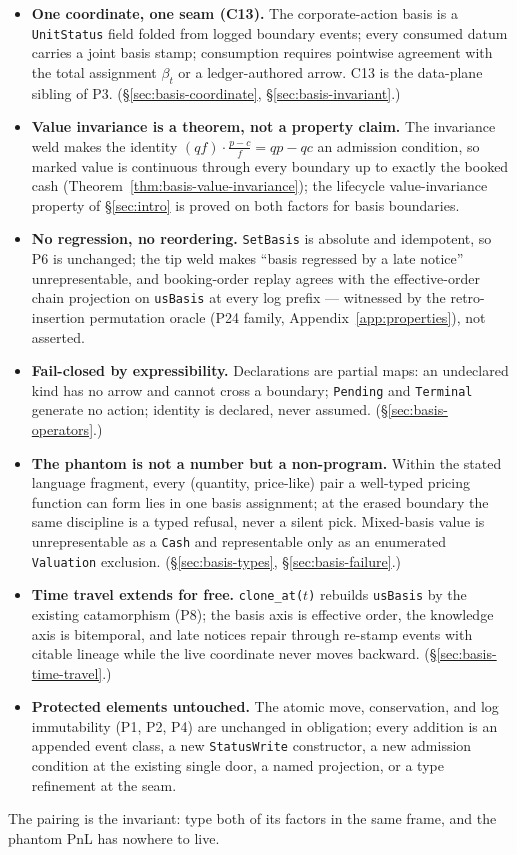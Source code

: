 \begin{itemize}[nosep]
\item \textbf{One coordinate, one seam (C13).} The corporate-action basis is a
\texttt{UnitStatus} field folded from logged boundary events; every consumed datum
carries a joint basis stamp; consumption requires pointwise agreement with the total
assignment $\beta_t$ or a ledger-authored arrow. C13 is the data-plane sibling of P3.
(\S\ref{sec:basis-coordinate}, \S\ref{sec:basis-invariant}.)
\item \textbf{Value invariance is a theorem, not a property claim.} The invariance weld
makes the identity $(qf)\cdot\frac{p-c}{f}=qp-qc$ an admission condition, so marked
value is continuous through every boundary up to exactly the booked cash
(Theorem~\ref{thm:basis-value-invariance}); the lifecycle value-invariance property of
\S\ref{sec:intro} is proved on both factors for basis boundaries.
\item \textbf{No regression, no reordering.} \texttt{SetBasis} is absolute and
idempotent, so P6 is unchanged; the tip weld makes ``basis regressed by a late notice''
unrepresentable, and booking-order replay agrees with the effective-order chain
projection on \texttt{usBasis} at every log prefix --- witnessed by the retro-insertion
permutation oracle (P24 family, Appendix~\ref{app:properties}), not asserted.
\item \textbf{Fail-closed by expressibility.} Declarations are partial maps: an
undeclared kind has no arrow and cannot cross a boundary; \texttt{Pending} and
\texttt{Terminal} generate no action; identity is declared, never assumed.
(\S\ref{sec:basis-operators}.)
\item \textbf{The phantom is not a number but a non-program.} Within the stated language
fragment, every (quantity, price-like) pair a well-typed pricing function can form lies
in one basis assignment; at the erased boundary the same discipline is a typed refusal,
never a silent pick. Mixed-basis value is unrepresentable as a \texttt{Cash} and
representable only as an enumerated \texttt{Valuation} exclusion.
(\S\ref{sec:basis-types}, \S\ref{sec:basis-failure}.)
\item \textbf{Time travel extends for free.} \texttt{clone\_at($t$)} rebuilds
\texttt{usBasis} by the existing catamorphism (P8); the basis axis is effective order,
the knowledge axis is bitemporal, and late notices repair through re-stamp events with
citable lineage while the live coordinate never moves backward.
(\S\ref{sec:basis-time-travel}.)
\item \textbf{Protected elements untouched.} The atomic move, conservation, and log
immutability (P1, P2, P4) are unchanged in obligation; every addition is an appended
event class, a new \texttt{StatusWrite} constructor, a new admission condition at the
existing single door, a named projection, or a type refinement at the seam.
\end{itemize}

\noindent
The pairing is the invariant: type both of its factors in the same frame, and the
phantom PnL has nowhere to live.
